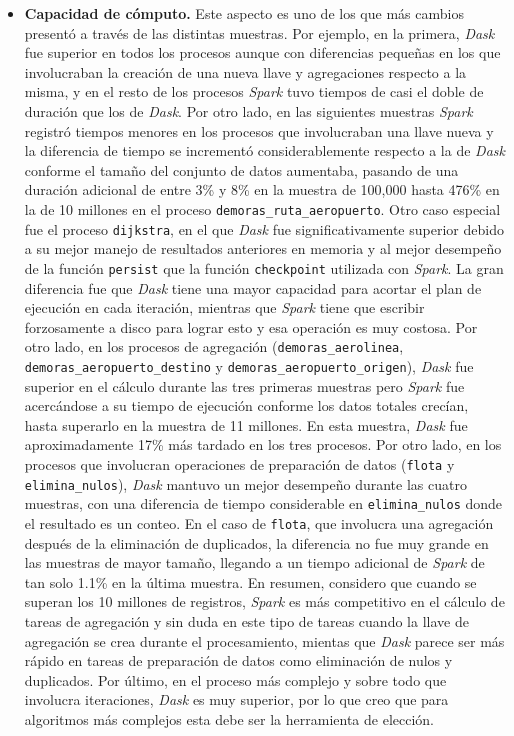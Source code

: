 \begin{itemize}
	\item \textbf{Capacidad de cómputo.} Este aspecto es uno de los que más cambios presentó a través de las distintas muestras. Por ejemplo, en la primera, \textit{Dask} fue superior en todos los procesos aunque con diferencias pequeñas en los que involucraban la creación de una nueva llave y agregaciones respecto a la misma, y en el resto de los procesos \textit{Spark} tuvo tiempos de casi el doble de duración que los de \textit{Dask}. Por otro lado, en las siguientes muestras \textit{Spark} registró tiempos menores en los procesos que involucraban una llave nueva y la diferencia de tiempo se incrementó considerablemente respecto a la de \textit{Dask} conforme el tamaño del conjunto de datos aumentaba, pasando de una duración adicional de entre 3\% y 8\% en la muestra de 100,000 hasta 476\% en la de 10 millones en el proceso \texttt{demoras\_ruta\_aeropuerto}. Otro caso especial fue el proceso \texttt{dijkstra}, en el que \textit{Dask} fue significativamente superior debido a su mejor manejo de resultados anteriores en memoria y al mejor desempeño de la función \texttt{persist} que la función \texttt{checkpoint} utilizada con \textit{Spark}. La gran diferencia fue que \textit{Dask} tiene una mayor capacidad para acortar el plan de ejecución en cada iteración, mientras que \textit{Spark} tiene que escribir forzosamente a disco para lograr esto y esa operación es muy costosa. Por otro lado, en los procesos de agregación (\texttt{demoras\_aerolinea}, \texttt{demoras\_aeropuerto\_destino} y \texttt{demoras\_aeropuerto\_origen}), \textit{Dask} fue superior en el cálculo durante las tres primeras muestras pero \textit{Spark} fue acercándose a su tiempo de ejecución conforme los datos totales crecían, hasta superarlo en la muestra de 11 millones. En esta muestra, \textit{Dask} fue aproximadamente 17\% más tardado en los tres procesos. Por otro lado, en los procesos que involucran operaciones de preparación de datos (\texttt{flota} y \texttt{elimina\_nulos}), \textit{Dask} mantuvo un mejor desempeño durante las cuatro muestras, con una diferencia de tiempo considerable en \texttt{elimina\_nulos} donde el resultado es un conteo. En el caso de \texttt{flota}, que involucra una agregación después de la eliminación de duplicados, la diferencia no fue muy grande en las muestras de mayor tamaño, llegando a un tiempo adicional de \textit{Spark} de tan solo 1.1\% en la última muestra. En resumen, considero que cuando se superan los 10 millones de registros, \textit{Spark} es más competitivo en el cálculo de tareas de agregación y sin duda en este tipo de tareas cuando la llave de agregación se crea durante el procesamiento, mientas que \textit{Dask} parece ser más rápido en tareas de preparación de datos como eliminación de nulos y duplicados. Por último, en el proceso más complejo y sobre todo que involucra iteraciones, \textit{Dask} es muy superior, por lo que creo que para algoritmos más complejos esta debe ser la herramienta de elección.
	

\end{itemize}
